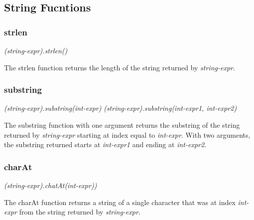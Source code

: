 \subsection{String Fucntions}

\subsubsection{strlen}
\begin{center}
\textsl{(string-expr).strlen()}
\end{center}
The strlen function returns the length of the string returned by \textsl{string-expr}.

\subsubsection{substring}
\begin{center}
\textsl{(string-expr).substring(int-expr)}
\textsl{(string-expr).substring(int-expr1, int-expr2)}
\end{center}
The substring function with one argument returns the substring of the string returned by \textsl{string-expr}
starting at index equal to \textsl{int-expr}. With two arguments, the substring returned starts at \textsl{int-expr1} 
and ending at \textsl{int-expr2}.

\subsubsection{charAt}
\begin{center}
\textsl{(string-expr).chatAt(int-expr))}
\end{center}
The charAt function returns a string of a single character that was at index \textsl{int-expr} from 
the string returned by \textsl{string-expr}.


